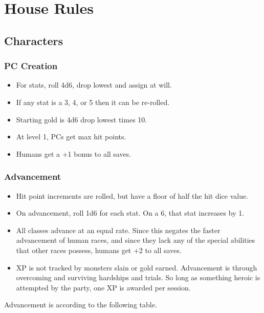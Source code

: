 \chapter{House Rules}
\section{Characters}

\subsection{PC Creation}
\begin{itemize}
	\item For stats, roll 4d6, drop lowest and assign at will.
	\item If any stat is a 3, 4, or 5 then it can be re-rolled.
	\item Starting gold is 4d6 drop lowest times 10.
	\item At level 1, PCs get max hit points.
	\item Humans get a +1 bonus to all saves.
\end{itemize}

\subsection{Advancement}
\begin{itemize}
	\item Hit point increments are rolled, but have a floor of half the hit
	      dice value.
	\item On advancement, roll 1d6 for each stat. On a 6, that stat increases
	      by 1.
	\item All classes advance at an equal rate. Since this negates the faster
	      advancement of human races, and since they lack any of the special
	      abilities that other races possess, humans get +2 to all saves.
	\item XP is not tracked by monsters slain or gold earned. Advancement is
	      through overcoming and surviving hardships and trials. So long as
	      something heroic is attempted by the party, one XP is awarded per
	      session.
\end{itemize}
Advancement is according to the following table.


